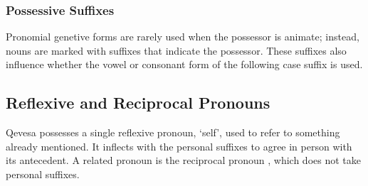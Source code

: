 \documentclass[grammar]{subfiles}
\begin{document}
\begin{landscape}
\end{landscape}

\subsubsection{Possessive Suffixes}
\label{sssec:mn_possessive_suffixes}

Pronomial genetive forms are rarely used when the possessor is animate;
instead, nouns are marked with suffixes that indicate the possessor.  These
suffixes also influence whether the vowel or consonant form of the following
case suffix is used.

\subsection{Reflexive and Reciprocal Pronouns}
\label{ssec:nm_reflexive_pronouns}

Qevesa possesses a single reflexive pronoun,  ‘self’, used to
refer to something already mentioned.  It inflects with the personal
suffixes to agree in person with its antecedent.  A related pronoun is the
reciprocal pronoun , which does not take personal suffixes.
\end{document}
